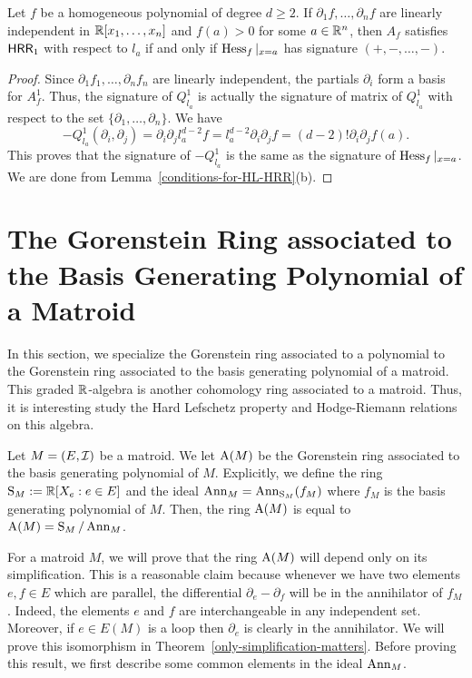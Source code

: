\documentclass{puthesis-UG}
\begin{document}
\begin{cor} \label{partial-independent-implies-hessian}
	Let $f$ be a homogeneous polynomial of degree $d \geq 2$. If $\partial_1 f, \ldots, \partial_n f$ are linearly independent in $\mathbb{R}[x_1, \ldots, x_n]$ and $f(a) > 0$ for some $a \in \mathbb{R}^n$, then $A_f$ satisfies $\mathsf{HRR}_1$ with respect to $l_a$ if and only if $\operatorname{Hess}_f|_{x = a}$ has signature $(+, -, \ldots, -)$. 
\end{cor}

\begin{proof}
	Since $\partial_1 f_1, \ldots, \partial_n f_n$ are linearly independent, the partials $\partial_i$ form a basis for $A_f^1$. Thus, the signature of $Q_{l_a}^1$ is actually the signature of matrix of $Q_{l_a}^1$ with respect to the set $\{\partial_1, \ldots, \partial_n\}.$ We have 
	\[
		-Q_{l_a}^1(\partial_i, \partial_j) = \partial_i \partial_j l_a^{d-2} f =  l_a^{d-2} \partial_i \partial_j f = (d-2)! \partial_i \partial_j f(a).
	\]
	This proves that the signature of $-Q^1_{l_a}$ is the same as the signature of $\operatorname{Hess}_f |_{x = a}$.  We are done from Lemma~\ref{conditions-for-HL-HRR}(b).
\end{proof}

\section{The Gorenstein Ring associated to the Basis Generating Polynomial of a Matroid}

In this section, we specialize the Gorenstein ring associated to a polynomial to the Gorenstein ring associated to the basis generating polynomial of a matroid. This graded $\mathbb{R}$-algebra is another cohomology ring associated to a matroid. Thus, it is interesting study the Hard Lefschetz property and Hodge-Riemann relations on this algebra. 

\begin{defn} \label{defn:basis-cohomology}
	Let $M = (E, \mathcal{I})$ be a matroid. We let $\operatorname{A}(M)$ be the Gorenstein ring associated to the basis generating polynomial of $M$. Explicitly, we define the ring $\operatorname{S}_M := \mathbb{R} [X_e : e \in E]$ and the ideal $\operatorname{Ann}_M = \operatorname{Ann}_{\operatorname{S}_M}(f_M)$ where $f_M$ is the basis generating polynomial of $M$. Then, the ring $\operatorname{A}(M)$ is equal to $\operatorname{A}(M) = \operatorname{S}_M / \operatorname{Ann}_M$.
\end{defn}

For a matroid $M$, we will prove that the ring $\operatorname{A}(M)$ will depend only on its simplification. This is a reasonable claim because whenever we have two elements $e, f \in E$ which are parallel, the differential $\partial_e - \partial_f$ will be in the annihilator of $f_M$. Indeed, the elements $e$ and $f$ are interchangeable in any independent set. Moreover, if $e \in E(M)$ is a loop then $\partial_e$ is clearly in the annihilator. We will prove this isomorphism in Theorem~\ref{only-simplification-matters}. Before proving this result, we first describe some common elements in the ideal $\operatorname{Ann}_M$. 
\end{document}
